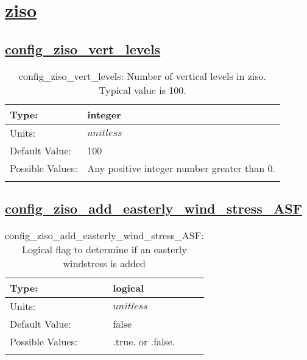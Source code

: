 \section[ziso]{\hyperref[sec:nm_tab_ziso]{ziso}}
\label{sec:nm_sec_ziso}
\subsection[config\_ziso\_vert\_levels]{\hyperref[sec:nm_tab_ziso]{config\_ziso\_vert\_levels}}
\label{subsec:nm_sec_config_ziso_vert_levels}
\begin{center}
\begin{longtable}{| p{2.0in} || p{4.0in} |}
    \hline
    Type: & integer \\
    \hline
    Units: & $unitless$ \\
    \hline
    Default Value: & 100 \\
    \hline
    Possible Values: & Any positive integer number greater than 0. \\
    \hline
    \caption{config\_ziso\_vert\_levels: Number of vertical levels in ziso. Typical value is 100.}
\end{longtable}
\end{center}
\subsection[config\_ziso\_add\_easterly\_wind\_stress\_ASF]{\hyperref[sec:nm_tab_ziso]{config\_ziso\_add\_easterly\_wind\_stress\_ASF}}
\label{subsec:nm_sec_config_ziso_add_easterly_wind_stress_ASF}
\begin{center}
\begin{longtable}{| p{2.0in} || p{4.0in} |}
    \hline
    Type: & logical \\
    \hline
    Units: & $unitless$ \\
    \hline
    Default Value: & false \\
    \hline
    Possible Values: & .true. or .false. \\
    \hline
    \caption{config\_ziso\_add\_easterly\_wind\_stress\_ASF: Logical flag to determine if an easterly windstress is added}
\end{longtable}
\end{center}
